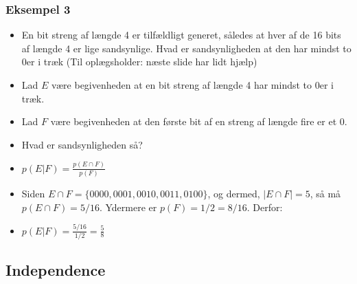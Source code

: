 \documentclass{beamer}
\begin{document}
\begin{frame}
  \frametitle{Eksempel 3}

  \begin{itemize}
  \item<1-> En bit streng af længde 4 er tilfældligt generet, således at hver af de 16 bits af længde 4 er lige sandsynlige. Hvad er sandsynligheden at den har mindst to 0er i træk (Til oplægsholder: næste slide har lidt hjælp)
  \item<2-> Lad $E$ være begivenheden at en bit streng af længde 4 har mindst to 0er i træk. 
  \item<2-> Lad $F$ være begivenheden at den første bit af en streng af længde fire er et 0. 
  \item<2-> Hvad er sandsynligheden så?
  \item<3-> $p(E|F) = \frac{p(E \cap F)}{p(F)}$
  \item<3-> Siden $E \cap F = \{0000,0001,0010,0011,0100\}$, og dermed, $|E \cap F| = 5$, så må $p(E \cap F) = 5/16$. Ydermere er $p(F) = 1/2 = 8/16$. Derfor:
  \item<3-> $p(E|F) = \frac{5/16}{1/2}= \frac{5}{8}$
  \end{itemize}
\end{frame}

\subsection{Independence}
\label{subsec:independence}
\end{document}

